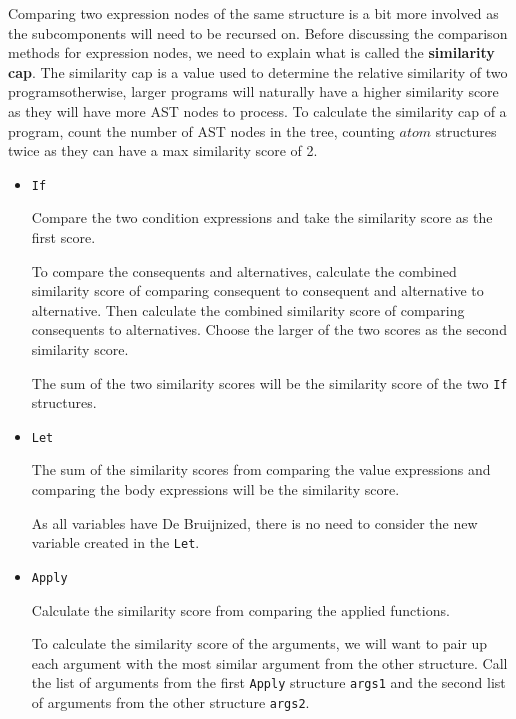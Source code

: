 \documentclass[12pt]{article}
\newcommand{\itm}[1]{\ensuremath{\mathit{#1}}}
\newcommand{\key}[1]{\texttt{#1}}
\newcommand{\Atm}[0]{\itm{atom}}
\begin{document}
\hfill

Comparing two expression nodes of the same structure is a bit more involved as the subcomponents will need to be recursed on. Before discussing the comparison methods for expression nodes, we need to explain what is called the \textbf{similarity cap}. The similarity cap is a value used to determine the relative similarity of two programs\textemdash otherwise, larger programs will naturally have a higher similarity score as they will have more AST nodes to process. To calculate the similarity cap of a program, count the number of AST nodes in the tree, counting \Atm{} structures twice as they can have a max similarity score of 2.

\hfill

\begin{itemize}
  \item\key{If}
    \begin{adjustwidth}{5mm}{}
      Compare the two condition expressions and take the similarity score as the first score.

      To compare the consequents and alternatives, calculate the combined similarity score of comparing consequent to consequent and alternative to alternative. Then calculate the combined similarity score of comparing consequents to alternatives. Choose the larger of the two scores as the second similarity score.

      The sum of the two similarity scores will be the similarity score of the two \key{If} structures.
    \end{adjustwidth}

  \item\key{Let}
    \begin{adjustwidth}{5mm}{}
      The sum of the similarity scores from comparing the value expressions and comparing the body expressions will be the similarity score.

      As all variables have De Bruijnized, there is no need to consider the new variable created in the \key{Let}.
    \end{adjustwidth}

  \item\key{Apply}
    \begin{adjustwidth}{5mm}{}
      Calculate the similarity score from comparing the applied functions.

      To calculate the similarity score of the arguments, we will want to pair up each argument with the most similar argument from the other structure. Call the list of arguments from the first \key{Apply} structure \key{args1} and the second list of arguments from the other structure \key{args2}.


\end{adjustwidth}
\end{itemize}
\end{document}
